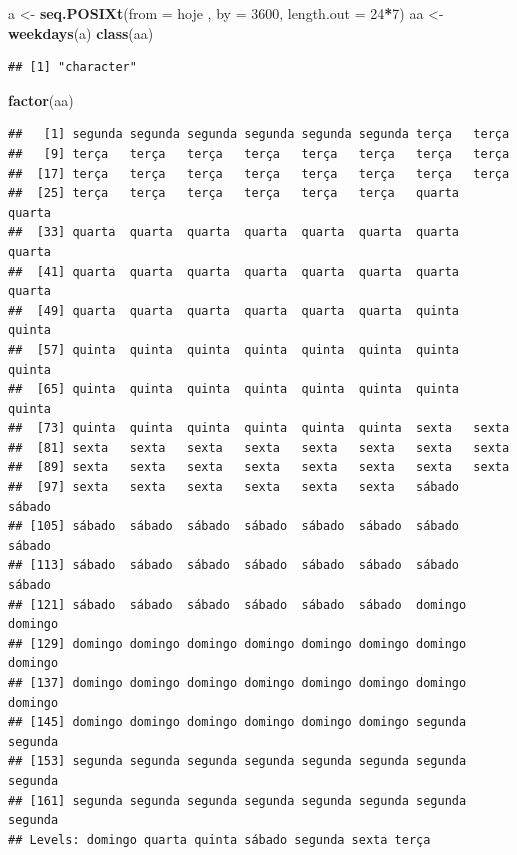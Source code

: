 \documentclass[]{book}
\newenvironment{Shaded}{\begin{snugshade}}{\end{snugshade}}
\newcommand{\KeywordTok}[1]{\textcolor[rgb]{0.13,0.29,0.53}{\textbf{#1}}}
\newcommand{\DataTypeTok}[1]{\textcolor[rgb]{0.13,0.29,0.53}{#1}}
\newcommand{\DecValTok}[1]{\textcolor[rgb]{0.00,0.00,0.81}{#1}}
\newcommand{\StringTok}[1]{\textcolor[rgb]{0.31,0.60,0.02}{#1}}
\newcommand{\OperatorTok}[1]{\textcolor[rgb]{0.81,0.36,0.00}{\textbf{#1}}}
\newcommand{\NormalTok}[1]{#1}
\theoremstyle{definition}
\theoremstyle{definition}
\theoremstyle{definition}
\theoremstyle{remark}
\begin{document}
\begin{Shaded}
\begin{Highlighting}[]
\NormalTok{a <-}\StringTok{ }\KeywordTok{seq.POSIXt}\NormalTok{(}\DataTypeTok{from =}\NormalTok{ hoje , }\DataTypeTok{by =} \DecValTok{3600}\NormalTok{, }\DataTypeTok{length.out =} \DecValTok{24}\OperatorTok{*}\DecValTok{7}\NormalTok{)}
\NormalTok{aa <-}\StringTok{ }\KeywordTok{weekdays}\NormalTok{(a)}
\KeywordTok{class}\NormalTok{(aa)}
\end{Highlighting}
\end{Shaded}

\begin{verbatim}
## [1] "character"
\end{verbatim}

\begin{Shaded}
\begin{Highlighting}[]
\KeywordTok{factor}\NormalTok{(aa)}
\end{Highlighting}
\end{Shaded}

\begin{verbatim}
##   [1] segunda segunda segunda segunda segunda segunda terça   terça  
##   [9] terça   terça   terça   terça   terça   terça   terça   terça  
##  [17] terça   terça   terça   terça   terça   terça   terça   terça  
##  [25] terça   terça   terça   terça   terça   terça   quarta  quarta 
##  [33] quarta  quarta  quarta  quarta  quarta  quarta  quarta  quarta 
##  [41] quarta  quarta  quarta  quarta  quarta  quarta  quarta  quarta 
##  [49] quarta  quarta  quarta  quarta  quarta  quarta  quinta  quinta 
##  [57] quinta  quinta  quinta  quinta  quinta  quinta  quinta  quinta 
##  [65] quinta  quinta  quinta  quinta  quinta  quinta  quinta  quinta 
##  [73] quinta  quinta  quinta  quinta  quinta  quinta  sexta   sexta  
##  [81] sexta   sexta   sexta   sexta   sexta   sexta   sexta   sexta  
##  [89] sexta   sexta   sexta   sexta   sexta   sexta   sexta   sexta  
##  [97] sexta   sexta   sexta   sexta   sexta   sexta   sábado  sábado 
## [105] sábado  sábado  sábado  sábado  sábado  sábado  sábado  sábado 
## [113] sábado  sábado  sábado  sábado  sábado  sábado  sábado  sábado 
## [121] sábado  sábado  sábado  sábado  sábado  sábado  domingo domingo
## [129] domingo domingo domingo domingo domingo domingo domingo domingo
## [137] domingo domingo domingo domingo domingo domingo domingo domingo
## [145] domingo domingo domingo domingo domingo domingo segunda segunda
## [153] segunda segunda segunda segunda segunda segunda segunda segunda
## [161] segunda segunda segunda segunda segunda segunda segunda segunda
## Levels: domingo quarta quinta sábado segunda sexta terça
\end{verbatim}
\end{document}
